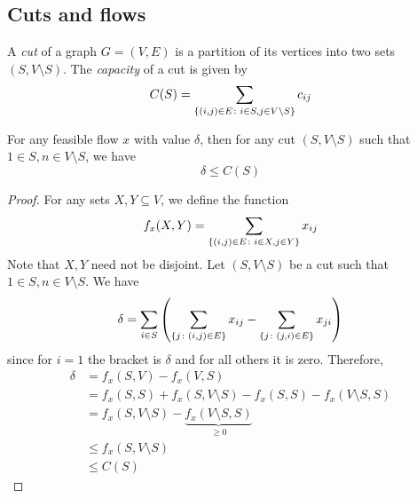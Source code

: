 \subsection{Cuts and flows}
\begin{definition}
	A \textit{cut} of a graph \( G = (V, E) \) is a partition of its vertices into two sets \( (S, V \setminus S) \).
	The \textit{capacity} of a cut is given by
	\[
		C(S) = \sum_{\qty{(i,j) \in E \colon i \in S, j \in V \setminus S}} c_{ij}
	\]
\end{definition}
\begin{theorem}
	For any feasible flow \( x \) with value \( \delta \), then for any cut \( (S, V \setminus S) \) such that \( 1 \in S, n \in V \setminus S \), we have
	\[
		\delta \leq C(S)
	\]
\end{theorem}
\begin{proof}
	For any sets \( X, Y \subseteq V \), we define the function
	\[
		f_x(X, Y) = \sum_{\qty{(i,j) \in E \colon i \in X, j \in Y}} x_{ij}
	\]
	Note that \( X, Y \) need not be disjoint.
	Let \( (S, V \setminus S) \) be a cut such that \( 1 \in S, n \in V \setminus S \).
	We have
	\[
		\delta = \sum_{i \in S} \qty( \sum_{\qty{j \colon (i,j) \in E}} x_{ij} - \sum_{\qty{j \colon (j,i) \in E}} x_{ji} )
	\]
	since for \( i = 1 \) the bracket is \( \delta \) and for all others it is zero.
	Therefore,
	\begin{align*}
		\delta & = f_x(S, V) - f_x(V, S)                                                 \\
		       & = f_x(S, S) + f_x(S, V \setminus S) - f_x(S, S) - f_x(V \setminus S, S) \\
		       & = f_x(S, V \setminus S) - \underbrace{f_x(V \setminus S, S)}_{\geq 0}   \\
		       & \leq f_x(S, V \setminus S)                                              \\
		       & \leq C(S)
	\end{align*}
\end{proof}

